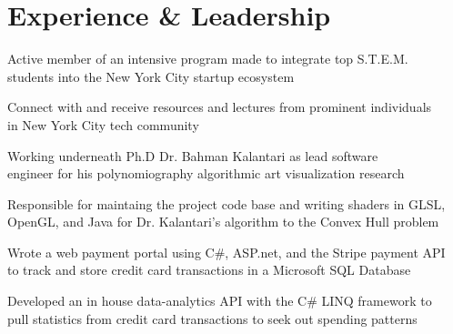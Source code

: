\documentclass[]{deedy-resume-openfont}
\begin{document}
\hfill
\begin{minipage}[t]{0.66\textwidth} 


\section{Experience \& Leadership}

\vspace{\topsep}
\begin{tightemize}
\item Active member of an intensive program made to integrate top S.T.E.M. \\students into the New York City startup ecosystem
\item Connect with and receive resources and lectures from prominent individuals \\in New York City tech community
\end{tightemize}
\sectionsep

\begin{tightemize}
\item Working underneath Ph.D Dr. Bahman Kalantari as lead software \\engineer for his polynomiography algorithmic art visualization research 
\item Responsible for maintaing the project code base and writing shaders in GLSL, OpenGL, and Java for Dr. Kalantari's algorithm to the Convex Hull problem
\end{tightemize}
\sectionsep

\vspace{\topsep} 
\begin{tightemize}
\item Wrote a web payment portal using C\#, ASP.net, and the Stripe payment API \\to track and store credit card transactions in a Microsoft SQL Database
\item Developed an in house data-analytics API with the C\# LINQ framework to \\pull statistics from credit card transactions to seek out spending patterns
\end{tightemize}
\sectionsep




\end{minipage}
\end{document}
